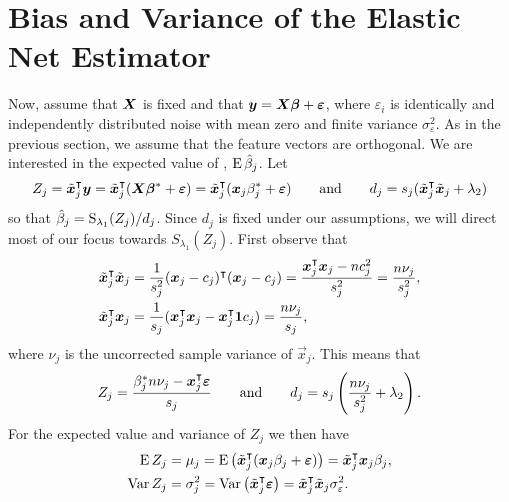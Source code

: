 \section{Bias and Variance of the Elastic Net Estimator}\label{sec:theory}


Now, assume that \(\boldsymbol{X}\) is fixed and that \(\boldsymbol{y} = \boldsymbol{X}\boldsymbol{\beta} +
\boldsymbol{\varepsilon}\), where \(\varepsilon_i\) is identically and independently distributed
noise with mean zero and finite variance \(\sigma_\varepsilon^2\). As in the previous
section, we assume that the feature vectors are orthogonal. We are interested in the
expected value of , \(\operatorname{E} \hat{\beta}_j\). Let
\[
  {Z_j} = \tilde{\boldsymbol{x}}_j^\intercal \boldsymbol{y} = \tilde{\boldsymbol{x}}_j^\intercal(\boldsymbol{X}\boldsymbol{\beta}^* + \boldsymbol{\varepsilon}) = \tilde{\boldsymbol{x}}_j^\intercal (\boldsymbol{x}_j\beta_j^* + \boldsymbol{\varepsilon})
  \qquad
  \text{and}
  \qquad
  d_j = s_j(\tilde{\boldsymbol{x}}_j^\intercal \tilde{\boldsymbol{x}}_j + \lambda_2)
\]
so that \(\hat{\beta}_j = \operatorname{S}_{\lambda_1}({Z_j})/d_j\). Since \(d_j\) is fixed under our
assumptions, we will direct most of our focus towards \(S_{\lambda_1}({Z_j})\). First
observe that
\[
  \begin{aligned}
    \tilde{\boldsymbol{x}}_j^\intercal \tilde{\boldsymbol{x}}_j & = \frac{1}{s_j^2}(\boldsymbol{x}_j - c_j)^\intercal (\boldsymbol{x}_j - c_j) = \frac{\boldsymbol{x}_j^\intercal\boldsymbol{x}_j - nc_j^2}{s^2_j} = \frac{n \nu_j}{s_j^2}, \\
    \tilde{\boldsymbol{x}}_j^\intercal \boldsymbol{x}_j         & = \frac{1}{s_j}(\boldsymbol{x}_j^\intercal \boldsymbol{x}_j - \boldsymbol{x}_j^\intercal \boldsymbol{1} c_j) = \frac{n \nu_j}{s_j},
  \end{aligned}
\]
where \(\nu_j\) is the uncorrected sample variance of \(\vec{x}_j\). This means that
\begin{equation}
  \label{eq:z-d}
  {Z_j} = \frac{\beta_j^* n \nu_j- \boldsymbol{x}_j^\intercal \boldsymbol{\varepsilon}}{s_j}
  \qquad\text{and}\qquad
  d_j = s_j\left(\frac{n \nu_j}{s_j^2} + \lambda_2\right).
\end{equation}
For the expected value and variance of \({Z_j}\) we then have
\begin{align*}
  \operatorname{E} {Z_j}   & = \mu_j = \operatorname{E} \left( \tilde{\boldsymbol{x}}_j^\intercal (\boldsymbol{x}_j\beta_j + \boldsymbol{\varepsilon}) \right)  = \tilde{\boldsymbol{x}}_j^\intercal\boldsymbol{x}_j \beta_j,      \\
  \operatorname{Var} {Z_j} & = \sigma_j^2 = \operatorname{Var}\left(\tilde{\boldsymbol{x}}_j ^\intercal \boldsymbol{\varepsilon}\right) = \tilde{\boldsymbol{x}}_j^\intercal \tilde{\boldsymbol{x}}_j\sigma_\varepsilon^2 .
\end{align*}

